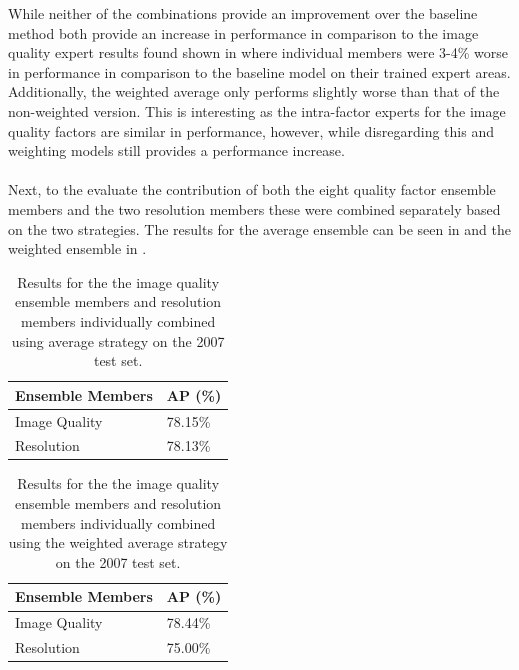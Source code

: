 While neither of the combinations provide an improvement over the baseline method both provide an increase in performance in comparison to the image quality expert results found shown in  where individual members were 3-4\% worse in performance in comparison to the baseline model on their trained expert areas. Additionally, the weighted average only performs slightly worse than that of the non-weighted version. This is interesting as the intra-factor experts for the image quality factors are similar in performance, however, while disregarding this and weighting models still provides a performance increase.
\\\\
Next, to the evaluate the contribution of both the eight quality factor ensemble members and the two resolution members these were combined separately based on the two strategies. The results for the average ensemble can be seen in  and the weighted ensemble in .

\begin{table}[h]
\centering
\caption{Results for the the image quality ensemble members and resolution members individually combined using average strategy on the 2007 test set.}
\label{tab:avgresind}
\begin{tabular}{|l|l|}
\hline
\textbf{Ensemble Members}        & \textbf{AP (\%)} \\ \hline
Image Quality & 78.15\% \\ \hline
Resolution    & 78.13\% \\ \hline
\end{tabular}
\end{table}

\begin{table}[h]
\centering
\caption{Results for the the image quality ensemble members and resolution members individually combined using the weighted average strategy on the 2007 test set.}
\label{tab:weiavgind}
\begin{tabular}{|l|l|}
\hline
\textbf{Ensemble Members}        & \textbf{AP (\%)} \\ \hline
Image Quality & 78.44\% \\ \hline
Resolution    & 75.00\% \\ \hline
\end{tabular}
\end{table}

